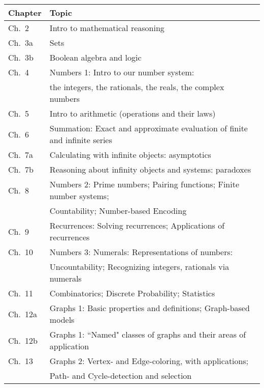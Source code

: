 \noindent
\begin{tabular}{|l|l|}
\hline
 {\bf Chapter} & {\bf Topic} \\
\hline
\hline
Ch.~2    & Intro to mathematical reasoning \\
Ch.~3a  & Sets \\
Ch.~3b  & Boolean algebra and logic \\
Ch.~4  & Numbers 1: Intro to our number system: \\
            & \hspace*{.67in}the integers, the rationals, the reals, the complex numbers \\
Ch.~5  &Intro to arithmetic (operations and their laws) \\
Ch.~6  & Summation: Exact and approximate evaluation of finite and infinite series   \\
Ch.~7a & Calculating with infinite objects: asymptotics \\
Ch.~7b  & Reasoning about infinity objects and systems: paradoxes \\
Ch.~8  & Numbers 2: Prime numbers; Pairing functions; Finite number systems; \\
            & \hspace*{.67in}Countability; Number-based Encoding  \\
Ch.~9  & Recurrences: Solving recurrences; Applications of recurrences \\
Ch.~10 & Numbers 3: Numerals: Representations of numbers: \\
             & \hspace*{.67in}Uncountability; Recognizing integers, rationals via numerals \\
Ch.~11  & Combinatorics; Discrete Probability; Statistics \\
Ch.~12a & Graphs 1: Basic properties and definitions; Graph-based models \\
Ch.~12b & Graphs 1: ``Named" classes of graphs and their areas of application \\
Ch.~13 & Graphs 2: Vertex- and Edge-coloring, with applications; \\
             & \hspace*{.67in}Path- and Cycle-detection and selection \\
\hline
\end{tabular}

\bigskip


